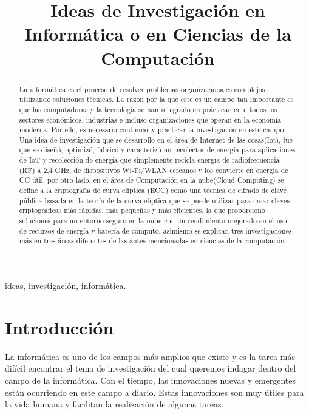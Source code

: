 \documentclass[10pt,journal]{IEEEtran}
\begin{document}
\title{Ideas de Investigación en Informática o en Ciencias de la Computación\\}
\author{
}
\maketitle
\begin{abstract}
La informática es el proceso de resolver problemas organizacionales complejos utilizando soluciones técnicas. La razón por la que este es un campo tan importante es que las computadoras y la tecnología se han integrado en prácticamente todos los sectores económicos, industrias e incluso organizaciones que operan en la economía moderna. Por ello, es necesario continuar y practicar la investigación en este campo. Una idea de investigación que se desarrollo en el área de Internet de las cosas(Iot), fue que se diseñó, optimizó, fabricó y caracterizó un recolector de energía para aplicaciones de IoT y recolección de energía que simplemente recicla energía de radiofrecuencia (RF) a 2,4 GHz, de dispositivos Wi-Fi/WLAN cercanos y los convierte en energía de CC útil, por otro lado, en el área de Computación en la nube(Cloud Computing)  se define a la criptografía de curva elíptica (ECC) como una técnica de cifrado de clave pública basada en la teoría de la curva elíptica que se puede utilizar para crear claves criptográficas más rápidas, más pequeñas y más eficientes, la que proporcionó soluciones para un entorno seguro en la nube con un rendimiento mejorado en el uso de recursos de energía y batería de cómputo, asimismo se explican tres investigaciones más en tres áreas diferentes de las antes mencionadas en ciencias de la computación.
\end{abstract}

\begin{IEEEkeywords}
ideas, investigación, informática.
\end{IEEEkeywords}

\section{\textbf{Introducción}}
La informática es uno de los campos más amplios que existe y es la tarea más difícil encontrar el tema de investigación del cual queremos indagar dentro del campo de la informática. Con el tiempo, las innovaciones nuevas y emergentes están ocurriendo en este campo a diario. Estas innovaciones son muy útiles para la vida humana y facilitan la realización de algunas tareas. 
\end{document}
